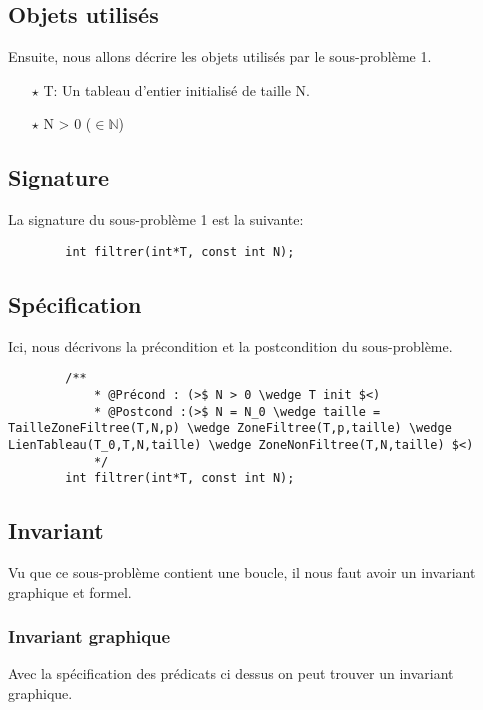 \documentclass[a4paper, 11pt, oneside]{article}
\begin{document}
    \subsection{Objets utilisés}
        Ensuite, nous allons décrire les objets utilisés par le sous-problème 1.
            \begin{itemize}
                \item[$\star$] T: Un tableau d'entier initialisé de taille N.
                \item[$\star$] N > 0 ($\in \mathbb{N}$)
            \end{itemize}

    \subsection{Signature}
        La signature du sous-problème 1 est la suivante:
        \begin{lstlisting}
        int filtrer(int*T, const int N);
        \end{lstlisting}
        
    \subsection{Spécification}
        Ici, nous décrivons la précondition et la postcondition du sous-problème.
        \begin{lstlisting}
        /**
            * @Précond : (>$ N > 0 \wedge T init $<)
            * @Postcond :(>$ N = N_0 \wedge taille = TailleZoneFiltree(T,N,p) \wedge ZoneFiltree(T,p,taille) \wedge LienTableau(T_0,T,N,taille) \wedge ZoneNonFiltree(T,N,taille) $<)
            */
        int filtrer(int*T, const int N);
        \end{lstlisting}

    \subsection{Invariant}
        Vu que ce sous-problème contient une boucle, il nous faut avoir un invariant graphique et formel.
        \subsubsection{Invariant graphique}

        Avec la spécification des prédicats ci dessus on peut trouver un invariant graphique.
        
\end{document}
